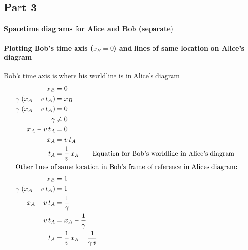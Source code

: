 \documentclass[pagesize,headsepline,10pt,parskip=half]{scrreprt}
\begin{document}
      \subsection{Part 3}
        \paragraph{Spacetime diagrams for Alice and Bob (separate)}
        \paragraph{Plotting Bob’s time axis ($x_B = 0$) and lines of
          same location on Alice’s diagram}
          Bob’s time axis is where his worldline is in Alice’s diagram
          \begin{align*}
            x_B &= 0\\
            \gamma \, \left(x_A - v \, t_A\right) &= x_B\\
            \gamma \, \left(x_A - v \, t_A\right) &= 0\\
            \gamma  &\neq 0\\
            x_A - v \, t_A &= 0\\
            x_A &= v \, t_A\\
            t_A &= \frac{1}{v} \, x_A \qquad \text{Equation for Bob's worldline in Alice's diagram}\\
            \intertext{Other lines of same location in Bob's frame of reference in Alices diagram:}
            x_B &= 1\\
            \gamma \, \left(x_A - v \, t_A\right) &= 1\\
            x_A - v \, t_A &= \frac{1}{\gamma}\\
            v \, t_A &= x_A - \frac{1}{\gamma}\\
            t_A &= \frac{1}{v} \, x_A - \frac{1}{\gamma \, v}
          \end{align*}
\end{document}

